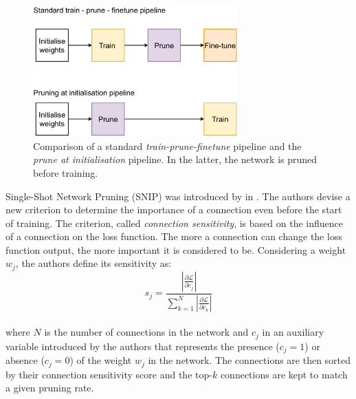 \begin{figure}[htbp]
  \centering
  \includegraphics[width=0.7\textwidth]{chapter_2/assets/prune_at_init_pipeline.pdf}
  \caption{Comparison of a standard \emph{train-prune-finetune} pipeline and the
  \emph{prune at initialisation} pipeline. In the latter, the network is pruned
  before training.}
  \label{fig:chap2:pipelines_pruning_at_initialisation}
\end{figure}

Single-Shot Network Pruning (SNIP) was introduced by
\citeauthor{DBLP:conf/iclr/LeeAT19} in \cite{DBLP:conf/iclr/LeeAT19}. The
authors devise a new criterion to determine the importance of a connection even
before the start of training. The criterion, called \emph{connection
sensitivity}, is based on the influence of a connection on the loss function.
The more a connection can change the loss function output, the more important it
is considered to be. Considering a weight $w_j$, the authors define its
sensitivity as:\\

\begin{equation}
  \label{eq:snip}
  s_j = \displaystyle\frac{\left|\displaystyle\frac{\partial \mathcal{L}}{\partial c_j}\right|}{\displaystyle\sum_{k=1}^N \left|\displaystyle\frac{\partial \mathcal{L}}{\partial c_k}\right|}
\end{equation}\\

\noindent where $N$ is the number of connections in the network and $c_j$ in an
auxiliary variable introduced by the authors that represents the presence
($c_j=1$) or absence ($c_j=0$) of the weight $w_j$ in the network. The
connections are then sorted by their connection sensitivity score and the
top-$k$ connections are kept to match a given pruning rate.\\

